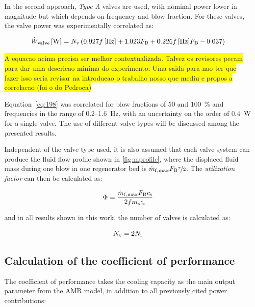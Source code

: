 \documentclass[referee]{svjour3}
\begin{document}
In the second approach, \emph{Type A} valves are used, with  nominal power lower in magnitude but which depends on frequency and blow fraction. For these valves, the valve power was experimentally correlated as:

\begin{equation}
  \label{eq:198}
  \dot{W}_{\mathrm{valve}}\,[\si{\watt}]= N_{\mathrm{v}}\left(0.927 f\,[\si{\hertz}] + 1.023 F_{\mathrm{B}} + 0.226 f\,[\si{\hertz}] F_{\mathrm{B}} - 0.037\right)
\end{equation}

\colorbox{yellow}{A equacao acima precisa ser melhor contextualizada. Talvez os revisores pecam para dar uma descricao minima do experimento. Uma saida para nao ter que fazer isso seria revisar na introducao o trabalho nosso que mediu e propos a correlacao (foi o do Pedroca)  }

Equation~\eqref{eq:198} was correlated for blow fractions of \num{50} and \SI{100}{\percent} and frequencies in the range of \num{0.2}--\SI{1.6}{\hertz}, with an uncertainty on the order of \SI{0.4}{\watt} for a single valve. The use of different valve types will be discussed among the presented results.

Independent of the valve type used, it is also assumed that each valve system can produce the fluid flow profile shown in \autoref{fig:mprofile}, where the displaced fluid mass during one blow in one regenerator bed is $\dot{m}_{\mathrm{f,max}} F_{\mathrm{B}} \nicefrac{\tau}{2}$. The \emph{utilization factor} can then be calculated as:

\begin{equation}
  \label{eq:110}
  \Phi = \frac{\dot{m}_{\mathrm{f,max}} F_{\mathrm{B}} c_{\mathrm{s}}}{2 f m_{\mathrm{s}} c_{\mathrm{s}}}
\end{equation}

\noindent and in all results shown in this work, the number of valves is calculated as:

\begin{equation}
  \label{eq:111}
  N_{\mathrm{v}} = 2 N_{\mathrm{r}}
\end{equation}

\subsection{Calculation of the coefficient of performance}
\label{sec:calc-coeff-perf}

The coefficient of performance takes the cooling capacity as the main output parameter from the AMR model, in addition to all previously cited power contributions:
\end{document}
